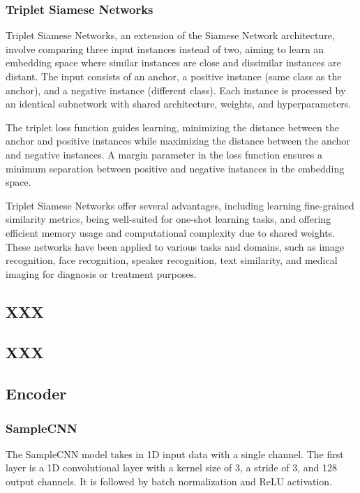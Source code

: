 \subsubsection{Triplet Siamese Networks}


Triplet Siamese Networks, an extension of the Siamese Network architecture, involve comparing three input instances instead of two, aiming to learn an embedding space where similar instances are close and dissimilar instances are distant. The input consists of an anchor, a positive instance (same class as the anchor), and a negative instance (different class). Each instance is processed by an identical subnetwork with shared architecture, weights, and hyperparameters.

The triplet loss function guides learning, minimizing the distance between the anchor and positive instances while maximizing the distance between the anchor and negative instances. A margin parameter in the loss function ensures a minimum separation between positive and negative instances in the embedding space.

Triplet Siamese Networks offer several advantages, including learning fine-grained similarity metrics, being well-suited for one-shot learning tasks, and offering efficient memory usage and computational complexity due to shared weights. These networks have been applied to various tasks and domains, such as image recognition, face recognition, speaker recognition, text similarity, and medical imaging for diagnosis or treatment purposes.

\subsection{XXX}
\subsection{XXX}

\subsection{Encoder}
\subsubsection{SampleCNN}

The SampleCNN model \cite{Lee2018SampleCNN:Classification} takes in 1D input data with a single channel. The first layer is a 1D convolutional layer with a kernel size of 3, a stride of 3, and 128 output channels. It is followed by batch normalization and ReLU activation.

